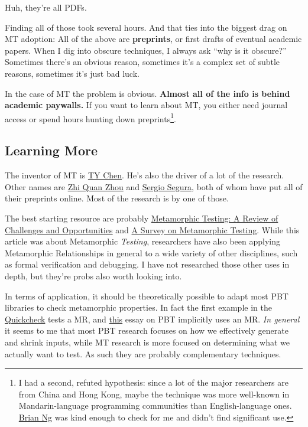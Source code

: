 Huh, they're all PDFs.

Finding all of those took several hours. And that ties into the biggest
drag on MT adoption: All of the above are \textbf{preprints}, or first
drafts of eventual academic papers. When I dig into obscure techniques,
I always ask ``why is it obscure?'' Sometimes there's an obvious reason,
sometimes it's a complex set of subtle reasons, sometimes it's just bad
luck.

In the case of MT the problem is obvious. \textbf{Almost all of the info
is behind academic paywalls.} If you want to learn about MT, you either
need journal access or spend hours hunting down
preprints\footnote{I had a second, refuted hypothesis:
  since a lot of the major researchers are from China and Hong Kong,
  maybe the technique was more well-known in Mandarin-language
  programming communities than English-language ones.
  \href{https://twitter.com/sindarknave}{Brian Ng} was kind enough to
  check for me and didn't find significant use.}.

\hypertarget{learning-more}{%
\subsection{Learning More}
\label{learning-more}}

The inventor of MT is
\href{https://www.swinburne.edu.au/science-engineering-technology/staff/profile/index.php?id=tychen}{TY
Chen}. He's also the driver of a lot of the research. Other names are
\href{https://www.uow.edu.au/~zhiquan/}{Zhi Quan Zhou} and
\href{http://personal.us.es/sergiosegura/publications/}{Sergio Segura},
both of whom have put all of their preprints online. Most of the
research is by one of those.

The best starting resource are probably
\href{http://www.cs.hku.hk/research/techreps/document/TR-2017-04.pdf}{Metamorphic
Testing: A Review of Challenges and Opportunities} and
\href{http://www.lsi.us.es/~segura/files/papers/segura16-tse.pdf}{A
Survey on Metamorphic Testing}. While this article was about Metamorphic
\emph{Testing}, researchers have also been applying Metamorphic
Relationships in general to a wide variety of other disciplines, such as
formal verification and debugging. I have not researched those other
uses in depth, but they're probs also worth looking into.

In terms of application, it should be theoretically possible to adapt
most PBT libraries to check metamorphic properties. In fact the first
example in the
\href{https://www.cs.tufts.edu/~nr/cs257/archive/john-hughes/quick.pdf}{Quickcheck}
tests a MR, and
\href{https://hypothesis.works/articles/testing-optimizers-with-hypothesis/}{this}
essay on PBT implicitly uses an MR. \emph{In general} it seems to me
that most PBT research focuses on how we effectively generate and shrink
inputs, while MT research is more focused on determining what we
actually want to test. As such they are probably complementary
techniques.


